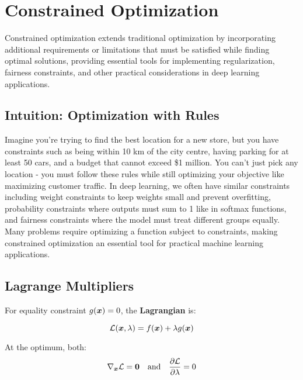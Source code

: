 
\section{Constrained Optimization }
\label{sec:constrained-optimization}

Constrained optimization extends traditional optimization by incorporating additional requirements or limitations that must be satisfied while finding optimal solutions, providing essential tools for implementing regularization, fairness constraints, and other practical considerations in deep learning applications.

\subsection{Intuition: Optimization with Rules}

Imagine you're trying to find the best location for a new store, but you have constraints such as being within 10 km of the city centre, having parking for at least 50 cars, and a budget that cannot exceed \$1 million. You can't just pick any location - you must follow these rules while still optimizing your objective like maximizing customer traffic. In deep learning, we often have similar constraints including weight constraints to keep weights small and prevent overfitting, probability constraints where outputs must sum to 1 like in softmax functions, and fairness constraints where the model must treat different groups equally. Many problems require optimizing a function subject to constraints, making constrained optimization an essential tool for practical machine learning applications.

\subsection{Lagrange Multipliers}

For equality constraint $g(\boldsymbol{x}) = 0$, the \textbf{Lagrangian} is:

\begin{equation}
\mathcal{L}(\boldsymbol{x}, \lambda) = f(\boldsymbol{x}) + \lambda g(\boldsymbol{x})
\end{equation}

At the optimum, both:
\begin{equation}
\nabla_{\boldsymbol{x}} \mathcal{L} = \boldsymbol{0} \quad \text{and} \quad \frac{\partial \mathcal{L}}{\partial \lambda} = 0
\end{equation}

